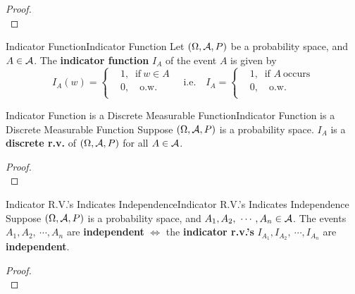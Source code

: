 \documentclass{elegantbook}
\begin{document}
\begin{proof}
\\[4cm]\vspace{0.01cm}
\end{proof}

\begin{definition}{Indicator Function}{Indicator Function}
Let $(\Omega,\mathcal{A}, P)$ be a probability space, and \(A \in \mathcal{A}\). The \textbf{indicator function} \(I_{A}\) of the event \(A\) is given by
\[I_{A}(w) = \left\{ \begin{aligned}
&1,\ \mathrm{\text{\ if}}\ w \in A \\
&0,\quad \mathrm{\text{o.w.}} \\
\end{aligned} \right.\quad \mathrm{\text{i.e.}}\quad I_{A} = \left\{ \begin{aligned}
&1,\ \mathrm{\text{ if }} A \ \mathrm{\text{occurs}} \\
&0,\quad \mathrm{\text{o.w.}} \\
\end{aligned} \right.\]
\end{definition}

\begin{theorem}{Indicator Function is a Discrete Measurable Function}{Indicator Function is a Discrete Measurable Function}
Suppose $(\Omega,\mathcal{A}, P)$ is a probability space. \(I_{A}\) is a \textbf{discrete r.v.} of $(\Omega,\mathcal{A}, P)$ for all \(A \in \mathcal{A}\).
\end{theorem}

\begin{proof}
\\[4cm]\vspace{0.01cm}
\end{proof}

\begin{theorem}{Indicator R.V.'s Indicates Independence}{Indicator R.V.'s Indicates Independence}
Suppose $(\Omega,\mathcal{A}, P)$ is a probability space, and \(A_{1},A_{2},\ \cdots,A_{n} \in \mathcal{A}\). The events \(A_{1},A_{2},\ \cdots,A_{n}\) are \textbf{independent} \(\Leftrightarrow\) the \textbf{indicator r.v.'s}
\(I_{A_{1}},I_{A_{2}},\ \cdots,I_{A_{n}}\) are \textbf{independent}.
\end{theorem}

\begin{proof}
\\[4cm]\vspace{0.01cm}
\end{proof}
\end{document}
